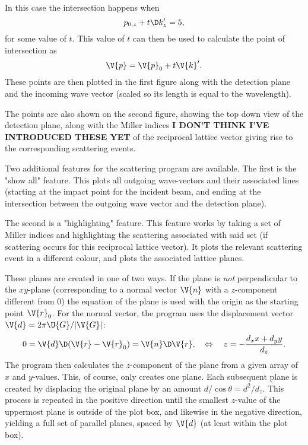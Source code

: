 \documentclass[main.tex]{subfiles}
\begin{document}
	In this case the intersection happens when
	\begin{equation}
		p_{0,z} + t\D k'_z = 5,
	\end{equation}
	for some value of $ t $. This value of $ t $ can then be used to calculate the point of intersection as
	\begin{equation}
		\V{p} = \V{p}_0 + t \V{k}'.
	\end{equation}
	These points are then plotted in the first figure along with the detection plane and the incoming wave vector (scaled so its length is equal to the wavelength).
	
	The points are also shown on the second figure, showing the top down view of the detection plane, along with the Miller indices \textbf{I DON'T THINK I'VE INTRODUCED THESE YET} of the reciprocal lattice vector giving rise to the corresponding scattering events.
	
	Two additional features for the scattering program are available. The first is the "show all" feature. This plots all outgoing wave-vectors and their associated lines (starting at the impact point for the incident beam, and ending at the intersection between the outgoing wave vector and the detection plane).
	
	The second is a "highlighting" feature. This feature works by taking a set of Miller indices and highlighting the scattering associated with said set (if scattering occurs for this reciprocal lattice vector). It plots the relevant scattering event in a different colour, and plots the associated lattice planes.
	
	These planes are created in one of two ways. If the plane is \textit{not} perpendicular to the $ xy $-plane (corresponding to a normal vector $ \V{n} $ with a $ z $-component different from 0) the equation of the plane is used with the origin as the starting point $ \V{r}_0 $. For the normal vector, the program uses the displacement vector $ \V{d} = 2\pi \U{G} / |\V{G}| $:
	\begin{equation}
		0 = \V{d} \D (\V{r}-\V{r}_0) = \V{n} \D \V{r}, \quad \Leftrightarrow \quad z = -\frac{d_x x + d_y y}{d_z}.
	\end{equation}
	The program then calculates the $ z $-component of the plane from a given array of $ x $ and $ y $-values. This, of course, only creates one plane. Each subsequent plane is created by displacing the original plane by an amount $ d/\cos \theta = d^2/d_z$. This process is repeated in the positive direction until the smallest $ z $-value of the uppermost plane is outside of the plot box, and likewise in the negative direction, yielding a full set of parallel planes, spaced by $ \V{d} $ (at least within the plot box).
	
\end{document}
